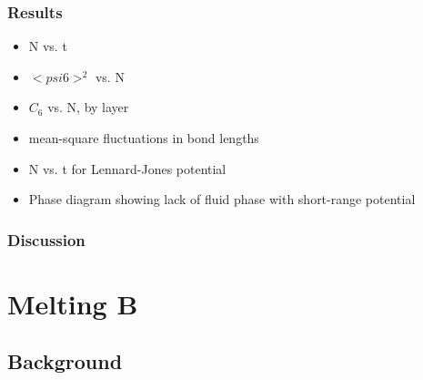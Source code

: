 \documentclass[11pt]{article}
\begin{document}
\subsubsection{Results}
\label{sec-2-3-6}
\begin{itemize}

\item N vs. t\\
\label{sec-2-3-6-1}%
\item $< psi6 >^2$ vs. N\\
\label{sec-2-3-6-2}%
\item $C_6$ vs. N, by layer\\
\label{sec-2-3-6-3}%
\item mean-square fluctuations in bond lengths\\
\label{sec-2-3-6-4}%
\item N vs. t for Lennard-Jones potential\\
\label{sec-2-3-6-5}%
\item Phase diagram showing lack of fluid phase with short-range potential\\
\label{sec-2-3-6-6}%
\end{itemize} %
\subsubsection{Discussion}
\label{sec-2-3-7}
\section{Melting B}
\label{sec-3}
\subsection{Background}
\label{sec-3-1}
\end{document}
